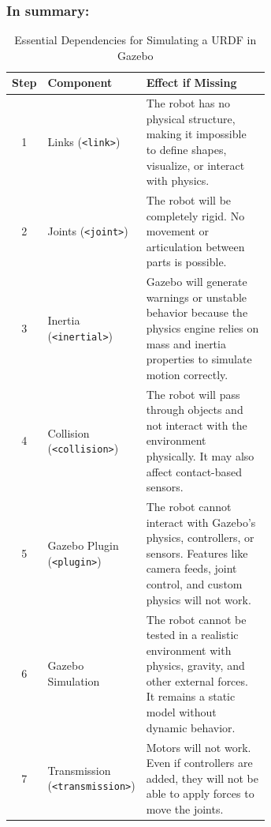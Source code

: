 \documentclass[../../main]{subfiles}
\begin{document}
\subsubsection*{In summary:}

\renewcommand{\arraystretch}{1.4} %
\begin{table}[ht]
    \centering
\begin{tcolorbox}[
    colback=red!5!white,colframe=red!75!black,
    title={\textbf{Dependencies for URDF Simulation in Gazebo}},
    fonttitle=\bfseries, coltitle=white, width=\linewidth
]

\centering
\begin{adjustbox}{max width=\linewidth} %
\begin{tabular}{c|l|p{0.65\linewidth}} %
    
    \rowcolor{red!20} 
    \textbf{Step} & \textbf{Component} & \textbf{Effect if Missing} \\
    \midrule
    1 & Links (\texttt{<link>}) & The robot has no physical structure, making it impossible to define shapes, visualize, or interact with physics. \\
    2 & Joints (\texttt{<joint>}) & The robot will be completely rigid. No movement or articulation between parts is possible. \\
    3 & Inertia (\texttt{<inertial>}) & Gazebo will generate warnings or unstable behavior because the physics engine relies on mass and inertia properties to simulate motion correctly. \\
    4 & Collision (\texttt{<collision>}) & The robot will pass through objects and not interact with the environment physically. It may also affect contact-based sensors. \\
    5 & Gazebo Plugin (\texttt{<plugin>}) & The robot cannot interact with Gazebo’s physics, controllers, or sensors. Features like camera feeds, joint control, and custom physics will not work. \\
    6 & Gazebo Simulation & The robot cannot be tested in a realistic environment with physics, gravity, and other external forces. It remains a static model without dynamic behavior. \\
    7 & Transmission (\texttt{<transmission>}) & Motors will not work. Even if controllers are added, they will not be able to apply forces to move the joints. \\
\end{tabular}
\end{adjustbox}
\end{tcolorbox}
\caption{Essential Dependencies for Simulating a URDF in Gazebo}  %
\end{table}
\newpage
\end{document}
